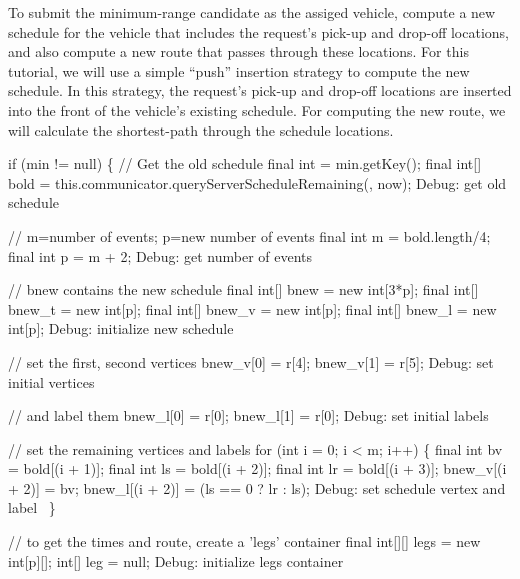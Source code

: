 To submit the minimum-range candidate as the assiged vehicle, compute a new
schedule for the vehicle that includes the request's pick-up and drop-off
locations, and also compute a new route that passes through these locations.
For this tutorial, we will use a simple ``push'' insertion strategy to compute
the new schedule. In this strategy, the request's pick-up and drop-off
locations are inserted into the front of the vehicle's existing schedule. For
computing the new route, we will calculate the shortest-path through the
schedule locations.

\nwenddocs{}\endmoddef\nwstartdeflinemarkup{}\nwenddeflinemarkup
if (min != null) \{
  // Get the old schedule
  final int  = min.getKey();
  final int[] bold = this.communicator.queryServerScheduleRemaining(, now);
  \LA{}Debug: get old schedule~{\nwtagstyle{}}\RA{}

  // m=number of events; p=new number of events
  final int m = bold.length/4;
  final int p = m + 2;
  \LA{}Debug: get number of events~{\nwtagstyle{}}\RA{}

  // bnew contains the new schedule
  final int[] bnew = new int[3*p];
  final int[] bnew_t = new int[p];
  final int[] bnew_v = new int[p];
  final int[] bnew_l = new int[p];
  \LA{}Debug: initialize new schedule~{\nwtagstyle{}}\RA{}

  // set the first, second vertices
  bnew_v[0] = r[4];
  bnew_v[1] = r[5];
  \LA{}Debug: set initial vertices~{\nwtagstyle{}}\RA{}

  // and label them
  bnew_l[0] = r[0];
  bnew_l[1] = r[0];
  \LA{}Debug: set initial labels~{\nwtagstyle{}}\RA{}

  // set the remaining vertices and labels
  for (int i = 0; i < m; i++) \{
    final int bv = bold[(i + 1)];
    final int ls = bold[(i + 2)];
    final int lr = bold[(i + 3)];
    bnew_v[(i + 2)] = bv;
    bnew_l[(i + 2)] = (ls == 0 ? lr : ls);
    \LA{}Debug: set schedule vertex and label~{\nwtagstyle{}}\RA{}
  \}

  // to get the times and route, create a 'legs' container
  final int[][] legs = new int[p][];
  int[] leg = null;
  \LA{}Debug: initialize legs container~{\nwtagstyle{}}\RA{}

